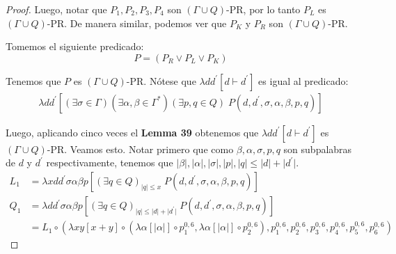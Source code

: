\begin{proof}
    \PN Luego, notar que $P_1, P_2 , P_3, P_4 $ son $(\Gamma \cup Q)$-PR, por lo tanto $P_L$ es $(\Gamma \cup Q)$-PR. De
    manera similar, podemos ver que $P_K$ y $P_R$ son $(\Gamma \cup Q)$-PR.

    \PN Tomemos el siguiente predicado:
    \[
      P = (P_{R}\vee P_{L}\vee P_{K})
    \]

    \PN Tenemos que $P$ es $(\Gamma \cup Q)$-PR. Nótese que $\lambda dd^{\prime} \left[d\vdash d^{\prime}\right]$ es
    igual al predicado:
    \begin{eqnarray*}
      \lambda dd^{\prime}\left[(\exists \sigma \in \Gamma)(\exists \alpha,\beta \in \Gamma^{\ast})(\exists p,q \in Q)
      \; P(d,d^{\prime},\sigma,\alpha,\beta,p,q)\right]
    \end{eqnarray*}

    \PN Luego, aplicando cinco veces el \textbf{Lemma 39} obtenemos que $\lambda dd^{\prime} \left[d\vdash d^{\prime}
    \right]$ es $(\Gamma \cup Q)$-PR. Veamos esto. Notar primero que como $\beta, \alpha, \sigma, p, q$ son subpalabras
    de $d$ y $d^{\prime}$ respectivamente, tenemos que $\lvert\beta\rvert, \lvert\alpha\rvert, \lvert\sigma\rvert,
    \lvert p \rvert, \lvert q \rvert \leq \lvert d \rvert + \lvert d^{\prime} \rvert$.
    \begin{align*}
      L_1 &= \lambda xdd^{\prime}\sigma\alpha\beta p \left[(\exists q \in Q)_{\lvert q \rvert \leq x} \; P(d,d^{\prime},
             \sigma,\alpha,\beta,p,q)\right] \\
      Q_1 &= \lambda dd^{\prime}\sigma\alpha\beta p \left[(\exists q \in Q)_{\lvert q \rvert \leq \lvert d \rvert +
             \lvert d^{\prime} \rvert} \; P(d,d^{\prime},\sigma,\alpha,\beta,p,q)\right] \\
          &= L_1 \circ (\lambda xy \left[x + y\right] \circ(\lambda \alpha \left[\lvert\alpha\rvert\right] \circ
             p_{1}^{0,6}, \lambda \alpha \left[\lvert\alpha\rvert\right] \circ p_{2}^{0,6}), p_{1}^{0,6}, p_{2}^{0,6},
             p_{3}^{0,6}, p_{4}^{0,6}, p_{5}^{0,6}, p_{6}^{0,6})
    \end{align*}


\end{proof}
